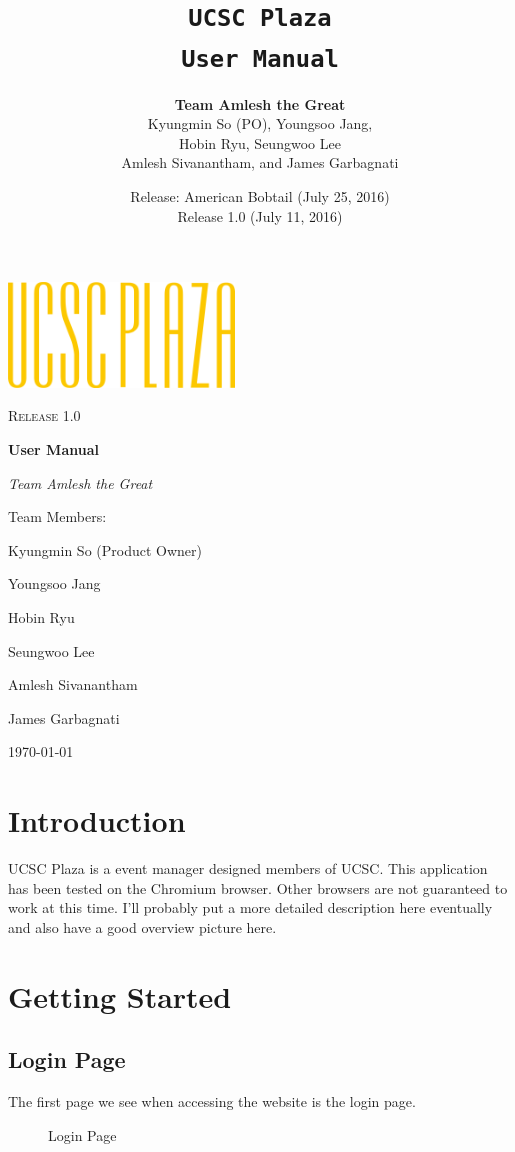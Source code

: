 \documentclass[10pt]{article}
\title{\color{primary}\texttt{UCSC Plaza \\ User Manual}}
\author{{\color{secondary}\textbf{Team Amlesh the Great}} \\ Kyungmin So (PO), Youngsoo Jang, \\ Hobin Ryu, Seungwoo Lee \\ Amlesh Sivanantham, and James Garbagnati }
\date{Release: American Bobtail (July 25, 2016) \\ Release 1.0 (July 11, 2016)}
\newcommand{\fancysec}[2] {{\color{primary}\section{#1} \label{sec:#2}}}
\newcommand{\fancysub}[2] {{\color{primary}\subsection{#1} \label{sec:#2}}}
\begin{document}
	
	\begin{titlepage}
		\centering
		\includegraphics[width=0.45\textwidth]{logo}\par\vspace{1cm}
		{\scshape\LARGE Release 1.0 \par}
		\vspace{1.5cm}
		{\huge\bfseries\color{primary} User Manual\par}
		\vspace{2cm}
		{\Large\itshape Team Amlesh the Great\par}
		\vfill
		Team Members:\par
		Kyungmin So (Product Owner)\par 
		Youngsoo Jang\par 
		Hobin Ryu\par 
		Seungwoo Lee\par 
		Amlesh Sivanantham\par 
		James Garbagnati
		
		\vfill
		
		{\large \today\par}
	\end{titlepage}
	\large\tableofcontents
	\clearpage
	
	\fancysec{Introduction}{intro}
		UCSC Plaza is a event manager designed members of UCSC. This application has been tested on the Chromium browser. Other browsers are not guaranteed to work at this time. I'll probably put a more detailed description here eventually and also have a good overview picture here.
	
	
	\fancysec{Getting Started}{getstarted}
		\fancysub{Login Page}{loginpage}
			The first page we see when accessing the website is the login page.
			
			\begin{figure}[H]
				\centering
				\caption{Login Page}
				\label{fig:awesome_image}
			\end{figure}
			
\end{document}

